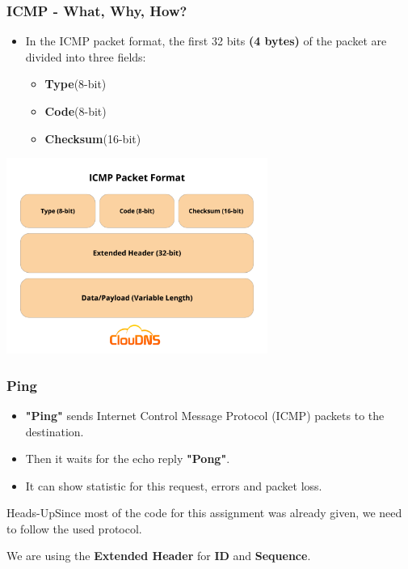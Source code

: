 \documentclass[aspectratio=169]{beamer}
\begin{document}
\begin{frame}
\frametitle{ICMP - What, Why, How?}

\begin{itemize}
    \item In the ICMP packet format, the first 32 bits \textbf{(4 bytes)} of the packet are divided into three fields:
    \begin{itemize}
        \item \textbf{Type}(8-bit)
        \item \textbf{Code}(8-bit) 
        \item \textbf{Checksum}(16-bit)
    \end{itemize}
\end{itemize}

\centering\includegraphics[width=0.64\textwidth]{ICMP-2.png}

\end{frame}

\begin{frame}
\frametitle{Ping}

\begin{itemize}
    \item  \textbf{"Ping"} sends Internet Control Message Protocol (ICMP) packets to the destination.
    \item Then it waits for the echo reply \textbf{"Pong"}.
    \item It can show statistic for this request, errors and packet loss.
\end{itemize}

\begin{alertblock}{Heads-Up}Since most of the code for this assignment was already given, we need to follow the used protocol.\end{alertblock}

We are using the \textbf{Extended Header} for \textbf{ID} and \textbf{Sequence}.

\end{frame}
\end{document}
